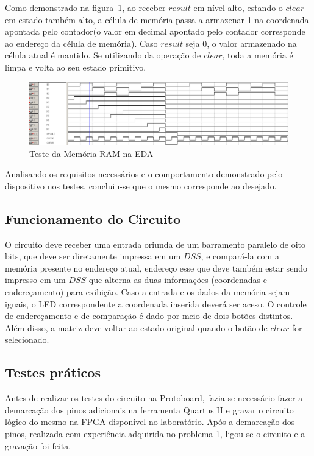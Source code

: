 \documentclass[12pt]{article}
\begin{document}
Como demonstrado na figura~\ref{fig:teste-ram}, ao receber $result$ em nível alto, estando o $clear$ em estado também alto, a célula de memória passa a armazenar 1 na coordenada apontada pelo contador(o valor em decimal apontado pelo contador corresponde ao endereço da célula de memória). Caso $result$ seja 0, o valor armazenado na célula atual é mantido. Se utilizando da operação de $clear$, toda a memória é limpa e volta ao seu estado primitivo.

\begin{figure}[!htbp]
\centering
\includegraphics[width=1\textwidth]{img/testeram.png}
\caption{Teste da Memória RAM na EDA}
\label{fig:teste-ram}
\end{figure}

Analisando os requisitos necessários e o comportamento demonstrado pelo dispositivo nos testes, concluiu-se que o mesmo corresponde ao desejado.

\subsection{Funcionamento do Circuito}

O circuito deve receber uma entrada oriunda de um barramento paralelo de oito bits, que deve ser diretamente impressa em um $DSS$, e compará-la com a memória presente no endereço atual, endereço esse que deve também estar sendo impresso em um $DSS$ que alterna as duas informações (coordenadas e endereçamento) para exibição. Caso a entrada e os dados da memória sejam iguais, o LED correspondente a coordenada inserida deverá ser aceso. O controle de endereçamento e de comparação é dado por meio de dois botões distintos. Além disso, a matriz deve voltar ao estado original quando o botão de $clear$ for selecionado.


\subsection{Testes práticos}
Antes de realizar os testes do circuito na Protoboard, fazia-se necessário fazer a demarcação dos pinos adicionais na ferramenta Quartus II e  gravar o circuito lógico do mesmo na FPGA disponível no laboratório. Após a demarcação dos pinos, realizada com experiência adquirida no problema 1, ligou-se o circuito e a gravação foi feita.
\end{document}
